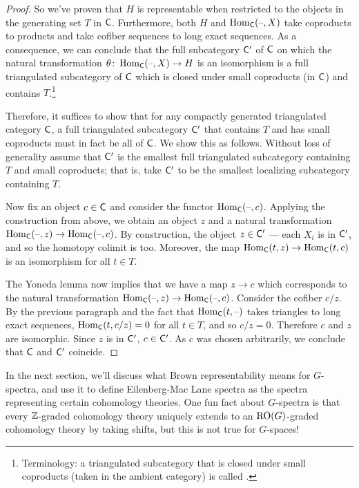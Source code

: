 \begin{proof}
So we've proven that $H$ is representable when restricted to the objects in the generating set $T$ in $\mathsf C$.
Furthermore, both $H$ and $\operatorname{Hom}_\mathsf C(\text{--},X)$ take coproducts to products and take cofiber sequences to long exact
sequences. As a consequence, we can conclude that the full subcategory $\mathsf C'$ of $\mathsf C$ on which the natural
transformation $\theta\colon \operatorname{Hom}_\mathsf C(\text{--},X)\to H$ is an isomorphism is a full triangulated subcategory of $\mathsf C$
which is closed under small coproducts (in $\mathsf C$) and contains $T$.\footnote{Terminology: a triangulated
subcategory that is closed under small coproducts (taken in the ambient category) is called .}

Therefore, it suffices to show that for any compactly generated triangulated category $\mathsf C$, a full triangulated
subcategory $\mathsf C'$ that contains $T$ and has small coproducts must in fact be all of $\mathsf C$. We show this as
follows. Without loss of generality assume that $\mathsf C'$ is the smallest full triangulated subcategory containing $T$
and small coproducts; that is, take $\mathsf C'$ to be the smallest localizing subcategory containing $T$.

Now fix an object $c\in\mathsf C$ and consider the functor $\operatorname{Hom}_\mathsf C(\text{--},c)$. Applying the construction from above, we
obtain an object $z$ and a natural transformation $\operatorname{Hom}_\mathsf C(\text{--},z) \to \operatorname{Hom}_\mathsf C(\text{--},c)$. By construction, the
object $z\in\mathsf C'$ --- each $X_i$ is in $\mathsf C'$, and so the homotopy colimit is too. Moreover, the map
$\operatorname{Hom}_\mathsf C(t,z)\to \operatorname{Hom}_\mathsf C(t,c)$ is an isomorphism for all $t\in T$.

The Yoneda lemma now implies that we have a map $z\to c$ which corresponds to the natural transformation
$\operatorname{Hom}_\mathsf C(\text{--},z) \to \operatorname{Hom}_\mathsf C(\text{--},c)$. Consider the cofiber $c/z$. By the previous paragraph and the fact that
$\operatorname{Hom}_\mathsf C(t,\text{--})$ takes triangles to long exact sequences, $\operatorname{Hom}_\mathsf C(t, c/z) = 0$ for all $t\in T$, and so $c/z =
0$. Therefore $c$ and $z$ are isomorphic. Since $z$ is in $\mathsf C'$, $c\in\mathsf C'$. As $c$ was chosen arbitrarily, we
conclude that $\mathsf C$ and $\mathsf C'$ coincide. 
\end{proof}
In the next section, we'll discuss what Brown representability means for $G$-spectra, and use it to define
Eilenberg-Mac Lane spectra as the spectra representing certain cohomology theories. One fun fact about $G$-spectra
is that every $\mathbb Z$-graded cohomology theory uniquely extends to an $\mathrm{RO}(G)$-graded cohomology theory by taking
shifts, but this is not true for $G$-spaces!
